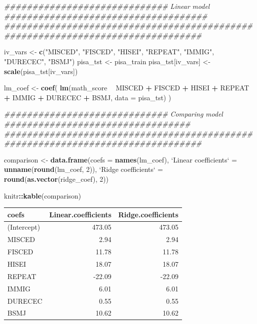 \documentclass[
]{book}
\newenvironment{Shaded}{\begin{snugshade}}{\end{snugshade}}
\newcommand{\CommentTok}[1]{\textcolor[rgb]{0.56,0.35,0.01}{\textit{#1}}}
\newcommand{\DataTypeTok}[1]{\textcolor[rgb]{0.13,0.29,0.53}{#1}}
\newcommand{\DecValTok}[1]{\textcolor[rgb]{0.00,0.00,0.81}{#1}}
\newcommand{\KeywordTok}[1]{\textcolor[rgb]{0.13,0.29,0.53}{\textbf{#1}}}
\newcommand{\NormalTok}[1]{#1}
\newcommand{\OperatorTok}[1]{\textcolor[rgb]{0.81,0.36,0.00}{\textbf{#1}}}
\newcommand{\StringTok}[1]{\textcolor[rgb]{0.31,0.60,0.02}{#1}}
\begin{document}
\begin{Shaded}
\begin{Highlighting}[]
\CommentTok{############################# Linear model ####################################}
\CommentTok{###############################################################################}

\NormalTok{iv_vars <-}\StringTok{ }\KeywordTok{c}\NormalTok{(}\StringTok{"MISCED"}\NormalTok{, }\StringTok{"FISCED"}\NormalTok{, }\StringTok{"HISEI"}\NormalTok{, }\StringTok{"REPEAT"}\NormalTok{, }\StringTok{"IMMIG"}\NormalTok{, }\StringTok{"DURECEC"}\NormalTok{, }\StringTok{"BSMJ"}\NormalTok{)}
\NormalTok{pisa_tst <-}\StringTok{ }\NormalTok{pisa_train}
\NormalTok{pisa_tst[iv_vars] <-}\StringTok{ }\KeywordTok{scale}\NormalTok{(pisa_tst[iv_vars])}

\NormalTok{lm_coef <-}\StringTok{ }\KeywordTok{coef}\NormalTok{(}
  \KeywordTok{lm}\NormalTok{(math_score }\OperatorTok{~}\StringTok{ }\NormalTok{MISCED }\OperatorTok{+}\StringTok{ }\NormalTok{FISCED }\OperatorTok{+}\StringTok{ }\NormalTok{HISEI }\OperatorTok{+}\StringTok{ }\NormalTok{REPEAT }\OperatorTok{+}\StringTok{ }\NormalTok{IMMIG }\OperatorTok{+}\StringTok{ }\NormalTok{DURECEC }\OperatorTok{+}\StringTok{ }\NormalTok{BSMJ,}
     \DataTypeTok{data =}\NormalTok{ pisa_tst)}
\NormalTok{)}

\CommentTok{############################# Comparing model #################################}
\CommentTok{###############################################################################}

\NormalTok{comparison <-}
\StringTok{  }\KeywordTok{data.frame}\NormalTok{(}\DataTypeTok{coefs =} \KeywordTok{names}\NormalTok{(lm_coef),}
             \StringTok{`}\DataTypeTok{Linear coefficients}\StringTok{`}\NormalTok{ =}\StringTok{ }\KeywordTok{unname}\NormalTok{(}\KeywordTok{round}\NormalTok{(lm_coef, }\DecValTok{2}\NormalTok{)),}
             \StringTok{`}\DataTypeTok{Ridge coefficients}\StringTok{`}\NormalTok{ =}\StringTok{ }\KeywordTok{round}\NormalTok{(}\KeywordTok{as.vector}\NormalTok{(ridge_coef), }\DecValTok{2}\NormalTok{))}

\NormalTok{knitr}\OperatorTok{::}\KeywordTok{kable}\NormalTok{(comparison)}
\end{Highlighting}
\end{Shaded}

\begin{tabular}{l|r|r}
\hline
coefs & Linear.coefficients & Ridge.coefficients\\
\hline
(Intercept) & 473.05 & 473.05\\
\hline
MISCED & 2.94 & 2.94\\
\hline
FISCED & 11.78 & 11.78\\
\hline
HISEI & 18.07 & 18.07\\
\hline
REPEAT & -22.09 & -22.09\\
\hline
IMMIG & 6.01 & 6.01\\
\hline
DURECEC & 0.55 & 0.55\\
\hline
BSMJ & 10.62 & 10.62\\
\hline
\end{tabular}
\end{document}
